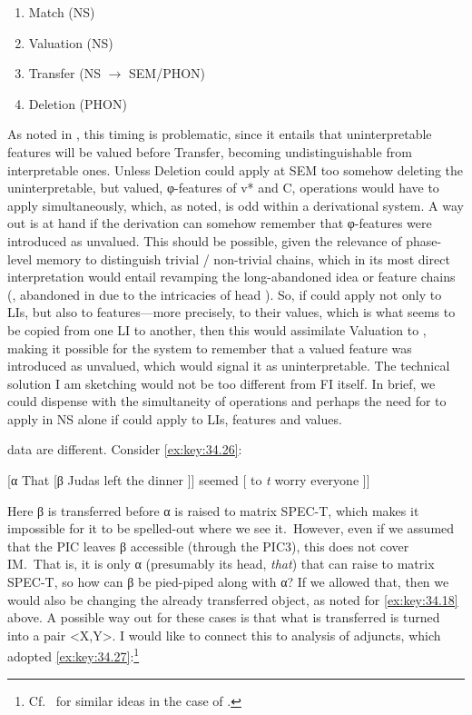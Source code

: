 \documentclass[output=paper]{langsci/langscibook}
\begin{document}
\ea%
    \label{ex:key:34.25}
    \begin{enumerate}
        \item Match (\gls{NS})\\
        \item Valuation (\gls{NS})\\
        \item Transfer (\gls{NS} ${\rightarrow}$ SEM/PHON)\\
        \item Deletion (PHON)\\
    \end{enumerate}
\z

As noted in \citet{EpSee2002}, this timing is problematic, since it entails that
uninterpretable features will be valued before Transfer, becoming
undistinguishable from interpretable ones. Unless Deletion could apply at S\gls{EM}
too somehow deleting the uninterpretable, but valued, φ-features of v* and C,
operations would have to apply simultaneously, which, as noted, is odd within a
derivational system. A way out is at hand if the derivation can somehow
remember that φ-features were introduced as unvalued. This should be possible,
given the relevance of phase-level memory to distinguish trivial / non-trivial
chains, which in its most direct interpretation would entail revamping the
long-abandoned idea or feature chains (\cites[262, 270--271, 383, fn.\
27]{Chomsky1995}, abandoned in \citealt{Chomsky2000} due to the intricacies of
head \isi{movement}). So, if \isi{Merge} could apply not only to LIs, but also to
features—more precisely, to their values, which is what seems to be copied from
one LI to another, then this would assimilate Valuation to \isi{Merge}, making it
possible for the system to remember that a valued feature was introduced as
unvalued, which would signal it as uninterpretable. The technical solution I am
sketching would not be too different from \gls{FI} itself. In brief, we could
dispense with the simultaneity of operations and perhaps the need for  to
apply in \gls{NS} alone if \isi{Merge} could apply to LIs, features and values.

 data are different. Consider \eqref{ex:key:34.26}:

\ea%
    \label{ex:key:34.26}
    [α That [β Judas left the dinner ]] seemed [ to \emph{t} worry everyone ]]
\z

Here β is transferred before α is raised to matrix SPEC-T,
which makes it impossible for it to be spelled-out where we see it.~However,
even if we assumed that the \gls{PIC} leaves β accessible (through the PIC3),
this does not cover \gls{IM}.~That is, it is only α (presumably its head,
\emph{that}) that can raise to matrix SPEC-T, so how can β be
pied-piped along with α? If we allowed that, then we would also be
changing the already transferred object, as noted for \eqref{ex:key:34.18} above. A possible
way out for these cases is that what is transferred is turned into a pair
<X,Y>. I would like to connect this to \citegen{Chomsky2004} analysis of adjuncts,
which adopted \eqref{ex:key:34.27}:\footnote{Cf.~\citet[139]{Chomsky2008} for similar ideas
    in the case of \isi{Merge}.}
\end{document}
